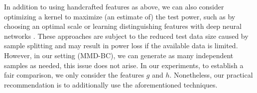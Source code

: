 \documentclass{article}
\newcommand{\hksay}[1]{[\textcolor{green!70!black}{\textbf{HK: }}\textcolor{green!50!black}{#1}]}
\begin{document}
In addition to using handcrafted features as above, we can also consider optimizing a kernel to maximize (an estimate of) the test power, such as by choosing an optimal scale \citep{Gretton2012, Sutherland2017} or learning distinguishing features with deep neural networks \citep{Liu2020}. 
These approaches are subject to the reduced test data size caused by sample splitting and may result in power loss if the available data is limited.  
However, in our setting (MMD-BC), we can generate as many independent samples as needed, this issue does not arise. 
In our experiments, to establish a fair comparison, we only consider the features $g$ and $h$. 
Nonetheless, our practical recommendation is to additionally use the aforementioned techniques.




\end{document}
